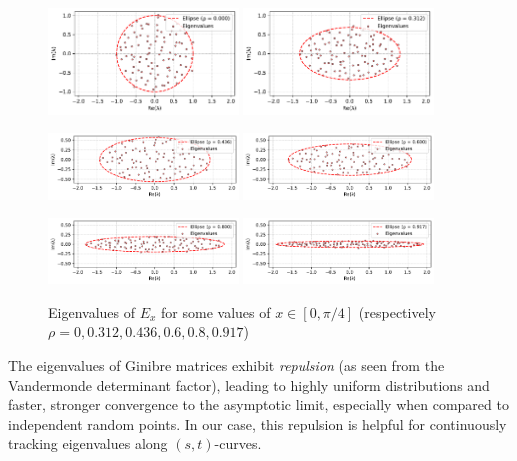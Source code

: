 \documentclass{article}
\begin{document}
	\begin{figure}[htbp]
		\centering

		\includegraphics[width=0.45\textwidth]{figures/ellipse_12.pdf}	
		\includegraphics[width=0.45\textwidth]{figures/ellipse_11.pdf}

		\includegraphics[width=0.45\textwidth]{figures/ellipse_10.pdf}	
		\includegraphics[width=0.45\textwidth]{figures/ellipse_9.pdf}

		\includegraphics[width=0.45\textwidth]{figures/ellipse_8.pdf}	
		\includegraphics[width=0.45\textwidth]{figures/ellipse_7.pdf}
		\caption{Eigenvalues of $E_x$ for some values of $x\in [0, \pi/4]$ (respectively $\rho =0, 0.312, 0.436, 0.6, 0.8, 0.917$)}
		\label{fig:elliptic}
	\end{figure}

	The eigenvalues of Ginibre matrices exhibit \emph{repulsion}  
	(as seen from the Vandermonde determinant factor),  
	leading to highly uniform distributions and faster, 
	stronger convergence to the asymptotic limit,  
	especially when compared to independent random points.  
	In our case, this repulsion is helpful for continuously 
	tracking eigenvalues along $(s,t)$-curves.
\end{document}
